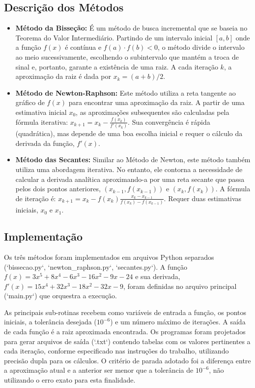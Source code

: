 \documentclass[12pt, a4paper]{article}
\begin{document}
\subsection*{Descrição dos Métodos}
\begin{itemize}
    \item \textbf{Método da Bisseção:} É um método de busca incremental que se baseia no Teorema do Valor Intermediário. Partindo de um intervalo inicial $[a, b]$ onde a função $f(x)$ é contínua e $f(a) \cdot f(b) < 0$, o método divide o intervalo ao meio sucessivamente, escolhendo o subintervalo que mantém a troca de sinal e, portanto, garante a existência de uma raiz. A cada iteração $k$, a aproximação da raiz é dada por $x_k = (a+b)/2$.

    \item \textbf{Método de Newton-Raphson:} Este método utiliza a reta tangente ao gráfico de $f(x)$ para encontrar uma aproximação da raiz. A partir de uma estimativa inicial $x_0$, as aproximações subsequentes são calculadas pela fórmula iterativa: $x_{k+1} = x_k - \frac{f(x_k)}{f'(x_k)}$. Sua convergência é rápida (quadrática), mas depende de uma boa escolha inicial e requer o cálculo da derivada da função, $f'(x)$.

    \item \textbf{Método das Secantes:} Similar ao Método de Newton, este método também utiliza uma abordagem iterativa. No entanto, ele contorna a necessidade de calcular a derivada analítica aproximando-a por uma reta secante que passa pelos dois pontos anteriores, $(x_{k-1}, f(x_{k-1}))$ e $(x_k, f(x_k))$. A fórmula de iteração é: $x_{k+1} = x_k - f(x_k) \frac{x_k - x_{k-1}}{f(x_k) - f(x_{k-1})}$. Requer duas estimativas iniciais, $x_0$ e $x_1$.
\end{itemize}

\subsection*{Implementação}
Os três métodos foram implementados em arquivos Python separados (`bissecao.py`, `newton_raphson.py`, `secantes.py`). A função $f(x) = 3x^5 + 8x^4 - 6x^3 - 16x^2 - 9x - 24$ e sua derivada, $f'(x) = 15x^4 + 32x^3 - 18x^2 - 32x - 9$, foram definidas no arquivo principal (`main.py`) que orquestra a execução.

As principais sub-rotinas recebem como variáveis de entrada a função, os pontos iniciais, a tolerância desejada ($10^{-6}$) e um número máximo de iterações. A saída de cada função é a raiz aproximada encontrada. Os programas foram projetados para gerar arquivos de saída (`.txt`) contendo tabelas com os valores pertinentes a cada iteração, conforme especificado nas instruções do trabalho, utilizando precisão dupla para os cálculos. O critério de parada adotado foi a diferença entre a aproximação atual e a anterior ser menor que a tolerância de $10^{-6}$, não utilizando o erro exato para esta finalidade.
\end{document}
